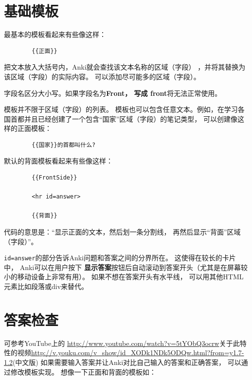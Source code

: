 \documentclass[a4paper]{book}
\begin{document}
	\section{基础模板}
	最基本的模板看起来有些像这样：
	
	\begin{shaded}\begin{verbatim}
		{{正面}}
		\end{verbatim}\end{shaded}
	
	把文本放入大括号内，Anki就会查找该文本名称的区域（字段） ，并将其替换为该区域（字段）的实际内容。 可以添加尽可能多的区域（字段）。
	
	\begin{shaded}
		字段名区分大小写。如果字段名为\textbf{Front， 写成 {{front}}}将无法正常使用。
	\end{shaded}
	
	模板并不限于区域（字段）的列表。 模板也可以包含任意文本。例如，在学习各国首都并且已经创建了一个包含“国家”区域（字段）的笔记类型， 可以创建像这样的正面模板：
	
	\begin{shaded}\begin{verbatim}
		{{国家}}的首都叫什么?
		\end{verbatim}\end{shaded}
	默认的背面模板看起来有些像这样：
	\begin{shaded}\begin{verbatim}
		{{FrontSide}}
		
		<hr id=answer>
		
		{{背面}}
		\end{verbatim}\end{shaded}
	代码的意思是：“显示正面的文本，然后划一条分割线， 再然后显示“背面”区域（字段）”。
	
	\verb|id=answer|的部分告诉Anki问题和答案之间的分界所在。 这使得在较长的卡片中， Anki可以在用户按下
	\textbf{显示答案}按钮后自动滚动到答案开头（尤其是在屏幕较小的移动设备上非常有用）。 如果不想在答案开头有水平线， 可以用其他HTML元素比如段落或div来替代。
	\section{答案检查}
	可参考YouTube上的 \url{http://www.youtube.com/watch?v=5tYObQ3ocrw}关于此特性的视频\url{http://v.youku.com/v_show/id_XODk1NDk5ODQw.html?from=y1.7-1.2}(中文版)
	如果需要输入答案并让Anki对比自己输入的答案和正确答案， 可以通过修改模板实现。 想像一下正面和背面的模板如：
	
\end{document}
